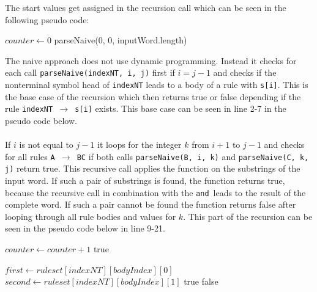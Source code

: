 \documentclass[a4paper, 11pt]{article}
\begin{document}
The start values get assigned in the recursion call which can be seen in the following pseudo code:
 
\begin{center}
\label{alg_naive_rec_call}
\begin{algorithmic}[1]
\State $counter \gets 0$
\State \Return parseNaive(0, 0, inputWord.length)
\end{algorithmic}
\hrulefill
\end{center}

The naive approach does not use dynamic programming. Instead it checks for each call \texttt{parseNaive(indexNT, i, j)} first if $i = j-1$ and checks if the nonterminal symbol head of \texttt{indexNT} leads to a body of a rule with \texttt{s[i]}. This is the base case of the recursion which then returns true or false depending if the rule \texttt{indexNT $\rightarrow$  s[i]} exists. This base case can be seen in line 2-7 in the pseudo code below.
\\ 
\\
If $i$ is not equal to $j-1$ it loops for the integer $k$ from $i+1$ to $j-1$ and checks for all rules \texttt{A $\rightarrow$ BC} if both calls \texttt{parseNaive(B, i, k)} and \texttt{parseNaive(C, k, j)} return true. This recursive call applies the function on the substrings of the input word. If such a pair of substrings is found, the function returns true, because the recursive call in combination with the \grqq \texttt{and}\grqq \ leads to the result of the complete word. If such a pair cannot be found the function returns false after looping through all rule bodies and values for $k$. This part of the recursion can be seen in the pseudo code below in line 9-21.





\begin{center}
 \label{parsenaivealg}
\begin{algorithmic}[1]
\State $counter \gets counter+1$
\State \Return true
\EndIf
\EndFor

\Else
{}
\State $first \gets ruleset[indexNT][bodyIndex][0]$
\State $second \gets ruleset[indexNT][bodyIndex][1]$
\State \Return true
\EndIf
\EndFor
\EndIf
\EndFor
\EndIf
\State \Return false
\end{algorithmic}
\hrulefill
\end{center}
\end{document}
